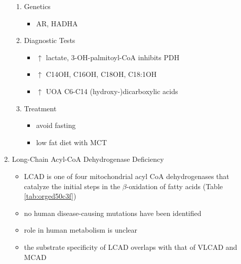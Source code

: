 \documentclass{scrartcl}
\begin{document}
\begin{enumerate}
\begin{enumerate}
\item Genetics
\label{sec:orgab27aa9}
\begin{itemize}
\item AR, HADHA
\end{itemize}

\item Diagnostic Tests
\label{sec:org46a6052}
\begin{itemize}
\item \(\uparrow\) lactate, 3-OH-palmitoyl-CoA inhibits PDH
\item \(\uparrow\) C14OH, C16OH, C18OH, C18:1OH
\item \(\uparrow\) UOA C6-C14 (hydroxy-)dicarboxylic acids
\end{itemize}

\item Treatment
\label{sec:org67a9f35}
\begin{itemize}
\item avoid fasting
\item low fat diet with MCT
\end{itemize}
\end{enumerate}
\item Long-Chain Acyl-CoA Dehydrogenase Deficiency
\label{sec:org955753c}
\begin{itemize}
\item LCAD is one of four mitochondrial acyl CoA dehydrogenases that
catalyze the initial steps in the \(\beta\)-oxidation of fatty acids
(Table \ref{tab:orged50c3f})
\item no human disease-causing mutations have been identified
\item role  in  human  metabolism  is unclear
\item the substrate specificity of LCAD overlaps with that of
VLCAD and MCAD
\end{itemize}


\end{enumerate}
\end{document}
